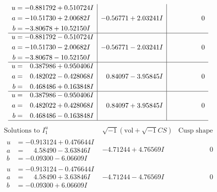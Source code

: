 \documentclass[1p]{elsarticle_modified}
\theoremstyle{definition}
\newcommand{\I}{\sqrt{-1}}
\begin{document}
$$\begin{array}{c|c|c}
\begin{aligned}
u &= -0.881792 + 0.510724 I \\
a &= -10.51730 + 2.00682 I \\
b &= -3.80678 + 10.52150 I\end{aligned}
 & -0.56771 + 2.03241 I & \phantom{-0.000000 } 0 \\ \hline\begin{aligned}
u &= -0.881792 - 0.510724 I \\
a &= -10.51730 - 2.00682 I \\
b &= -3.80678 - 10.52150 I\end{aligned}
 & -0.56771 - 2.03241 I & \phantom{-0.000000 } 0 \\ \hline\begin{aligned}
u &= \phantom{-}0.387986 + 0.950406 I \\
a &= \phantom{-}0.482022 - 0.428068 I \\
b &= \phantom{-}0.468486 + 0.163848 I\end{aligned}
 & \phantom{-}0.84097 - 3.95845 I & \phantom{-0.000000 } 0 \\ \hline\begin{aligned}
u &= \phantom{-}0.387986 - 0.950406 I \\
a &= \phantom{-}0.482022 + 0.428068 I \\
b &= \phantom{-}0.468486 - 0.163848 I\end{aligned}
 & \phantom{-}0.84097 + 3.95845 I & \phantom{-0.000000 } 0\\
 \hline 
 \end{array}$$\newpage$$\begin{array}{c|c|c}  
\text{Solutions to }I^u_{1}& \I (\text{vol} + \sqrt{-1}CS) & \text{Cusp shape}\\
 \hline 
\begin{aligned}
u &= -0.913124 + 0.476644 I \\
a &= \phantom{-}4.58490 - 3.63846 I \\
b &= -0.09300 - 6.06609 I\end{aligned}
 & -4.71244 + 4.76569 I & \phantom{-0.000000 } 0 \\ \hline\begin{aligned}
u &= -0.913124 - 0.476644 I \\
a &= \phantom{-}4.58490 + 3.63846 I \\
b &= -0.09300 + 6.06609 I\end{aligned}
 & -4.71244 - 4.76569 I & \phantom{-0.000000 } 0 \\ \hline\begin{aligned}

\end{aligned}
\end{array}$$
\end{document}
